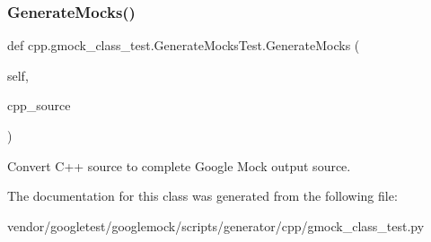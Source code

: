 \subsubsection{\texorpdfstring{Generate\+Mocks()}{GenerateMocks()}}
{\footnotesize\ttfamily def cpp.\+gmock\+\_\+class\+\_\+test.\+Generate\+Mocks\+Test.\+Generate\+Mocks (\begin{DoxyParamCaption}\item[{}]{self,  }\item[{}]{cpp\+\_\+source }\end{DoxyParamCaption})}

\begin{DoxyVerb}Convert C++ source to complete Google Mock output source.\end{DoxyVerb}
 

The documentation for this class was generated from the following file\+:\begin{DoxyCompactItemize}
\item 
vendor/googletest/googlemock/scripts/generator/cpp/gmock\+\_\+class\+\_\+test.\+py\end{DoxyCompactItemize}
